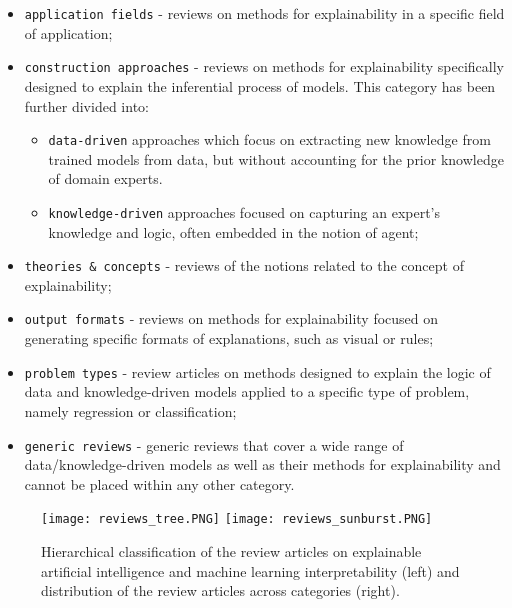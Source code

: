 \documentclass[final,1p,times]{elsarticle}
\begin{document}
\begin{itemize}
\item {\verb|application fields|} - reviews on methods for explainability in a specific field of application;
\item {\verb|construction approaches|} - reviews on methods for explainability specifically designed to explain the inferential process of models. This category has been further divided into:
\begin{itemize}
\item {\verb|data-driven|} approaches which focus on extracting new knowledge from trained models from data, but without accounting for the prior knowledge of domain experts. 
\item {\verb|knowledge-driven|} approaches focused on capturing an expert's knowledge and logic, often embedded in the notion of agent;
\end{itemize}
\item {\verb|theories & concepts|} - reviews of the notions related to the concept of explainability; 
\item {\verb|output formats|} - reviews on methods for explainability focused on generating specific formats of explanations, such as visual or rules; 
\item {\verb|problem types|} - review articles  on methods designed to explain the logic of data and knowledge-driven models applied to a specific type of problem, namely regression or classification;
\item {\verb|generic reviews|} - generic reviews that cover a wide range of data/knowledge-driven models as well as their methods for explainability and  cannot be placed within any other category. 
\end{itemize}

\begin{figure}[!ht]
  \texttt{[image: reviews\_tree.PNG]}
  \texttt{[image: reviews\_sunburst.PNG]}
  \caption{Hierarchical classification of the review articles on explainable artificial intelligence and machine learning interpretability (left) and distribution of the review articles across categories (right).}
  \label{fig:reviews_tree_chart}
\end{figure}
\end{document}
